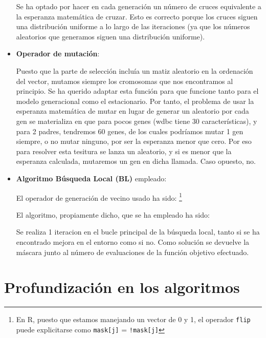 \documentclass[a4paper,11pt]{article}
\begin{document}
\begin{itemize}
  
  Se ha optado por hacer en cada generación un número de cruces equivalente a la esperanza matemática de cruzar. Esto es
  correcto porque los cruces siguen una distribución uniforme a lo largo de las iteraciones (ya que los números aleatorios
  que generamos siguen una distribución uniforme).
  
\item \textbf{Operador de mutación}:

  \small\texttt{}
  \normalsize
  
  Puesto que la parte de selección incluía un matiz aleatorio en la ordenación del vector, mutamos siempre los cromosomas
  que nos encontramos al principio. Se ha querido adaptar esta función para que funcione tanto para el modelo generacional
  como el estacionario. Por tanto, el problema de usar la esperanza matemática de mutar en lugar de generar un aleatorio
  por cada gen se materializa en que para pocos genes (wdbc tiene 30 características), y para 2 padres, tendremos 60 genes,
  de los cuales podríamos mutar 1 gen siempre, o no mutar ninguno, por ser la esperanza menor que cero. Por eso para 
  resolver esta tesitura se lanza un aleatorio, y si es menor que la esperanza calculada, mutaremos un gen en dicha 
  llamada. Caso opuesto, no.

\item \textbf{Algoritmo Búsqueda Local (BL)} empleado:
  
  El operador de generación de vecino usado ha sido:
  \footnote{En R, puesto que estamos manejando un vector de 0 y 1, el operador \texttt{flip} puede explicitarse como
  \texttt{mask[j]} = \texttt{!mask[j]}}
  
  \small\texttt{}
  \normalsize
     
  El algoritmo, propiamente dicho, que se ha empleado ha sido:\\
  
  \small\texttt{}
  \normalsize
  
  Se realiza 1 iteracion en el bucle principal de la búsqueda local, tanto si se ha encontrado mejora en el entorno como
  si no. Como solución se devuelve la máscara junto al número de evaluaciones de la función objetivo efectuado.

\end{itemize}

\section{Profundización en los algoritmos}
\end{document}
